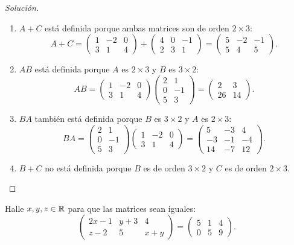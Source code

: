 \documentclass[a4,11pt]{aleph-notas}
\begin{document}
\begin{proof}[Soluci\'on]\hspace{0pt}
\begin{enumerate}
    \item $A+C$ est\'a definida porque ambas matrices son de orden $2\times 3$:
    \[
        A+C=
        \begin{pmatrix}1&-2&0\\3&1&4\end{pmatrix}+
        \begin{pmatrix}4&0&-1\\2&3&1\end{pmatrix}
        =\begin{pmatrix}5&-2&-1\\5&4&5\end{pmatrix}.
    \]
    \item $AB$ est\'a definida porque $A$ es $2\times 3$ y $B$ es $3\times 2$:
    \[
        AB=
        \begin{pmatrix}1&-2&0\\3&1&4\end{pmatrix}
        \begin{pmatrix}2&1\\0&-1\\5&3\end{pmatrix}
        =\begin{pmatrix}2&3\\26&14\end{pmatrix}.
    \]
    \item $BA$ tambi\'en est\'a definida porque $B$ es $3\times 2$ y $A$ es $2\times 3$:
    \[
        BA=
        \begin{pmatrix}2&1\\0&-1\\5&3\end{pmatrix}
        \begin{pmatrix}1&-2&0\\3&1&4\end{pmatrix}
        =\begin{pmatrix}5&-3&4\\-3&-1&-4\\14&-7&12\end{pmatrix}.
    \]
    \item $B+C$ no est\'a definida porque $B$ es de orden $3\times 2$ y $C$ es de orden $2\times 3$.
\end{enumerate}
\end{proof}

\begin{ejer}
    Halle $x,y,z\in\mathbb{R}$ para que las matrices sean iguales:
    \[
        \begin{pmatrix}
            2x-1 & y+3 & 4\\
            z-2 & 5 & x+y
        \end{pmatrix}
        =
        \begin{pmatrix}
            5 & 1 & 4\\
            0 & 5 & 9
        \end{pmatrix}.
    \]
\end{ejer}
\end{document}
